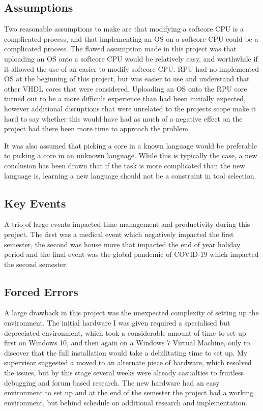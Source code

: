 	\subsection{Assumptions}
		Two reasonable assumptions to make are that modifying a softcore CPU is a complicated process, and that implementing an OS on a softcore CPU could be a complicated process. The flawed assumption made in this project was that uploading an OS onto a softcore CPU would be relatively easy, and worthwhile if it allowed the use of an easier to modify softcore CPU. RPU had no implemented OS at the beginning of this project, but was easier to use and understand that other VHDL cores that were considered. Uploading an OS onto the RPU core turned out to be a more difficult experience than had been initially expected, however additional disruptions that were unrelated to the projects scope make it hard to say whether this would have had as much of a negative effect on the project had there been more time to approach the problem.
		
		It was also assumed that picking a core in a known language would be preferable to picking a core in an unknown language. While this is typically the case, a new conclusion has been drawn that if the task is more complicated than the new language is, learning a new language should not be a constraint in tool selection.
	
	\subsection{Key Events}
		A trio of large events impacted time management and productivity during this project. The first was a medical event which negatively impacted the first semester, the second was house move that impacted the end of year holiday period and the final event was the global pandemic of COVID-19 which impacted the second semester.
		
	\subsection{Forced Errors}
		A large drawback in this project was the unexpected complexity of setting up the environment. The initial hardware I was given required a specialised but depreciated environment, which took a considerable amount of time to set up first on Windows 10, and then again on a Windows 7 Virtual Machine, only to discover that the full installation would take a debilitating time to set up. My supervisor suggested a moved to an alternate piece of hardware, which resolved the issues, but by this stage several weeks were already casualties to fruitless debugging and forum based research. The new hardware had an easy environment to set up and at the end of the semester the project had a working environment, but behind schedule on additional research and implementation.\\
		
